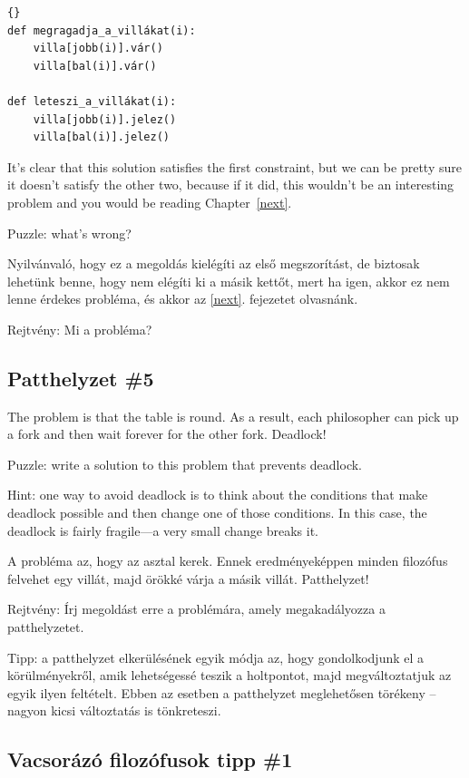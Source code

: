 \documentclass{book}
\newcommand{\clearemptydoublepage}{\newpage\cleardoublepage}
\begin{document}
\begin{lstlisting}[title={Vacsorázó filozófusok nem-megoldás}]{}
def megragadja_a_villákat(i):
    villa[jobb(i)].vár()
    villa[bal(i)].vár()

def leteszi_a_villákat(i):
    villa[jobb(i)].jelez()
    villa[bal(i)].jelez()
\end{lstlisting}

It's clear that this solution satisfies the first constraint, but
we can be pretty sure it doesn't satisfy the other two, because
if it did, this wouldn't be an interesting problem and you would
be reading Chapter~\ref{next}.

Puzzle: what's wrong?

Nyilvánvaló, hogy ez a megoldás kielégíti az első megszorítást, de biztosak
lehetünk benne, hogy nem elégíti ki a másik kettőt, mert ha igen,
akkor ez nem lenne érdekes probléma, és akkor az \ref{next}. fejezetet olvasnánk.

Rejtvény: Mi a probléma?

\clearemptydoublepage
\subsection{Patthelyzet \#5}

The problem is that the table is round.  As a result, each philosopher
can pick up a fork and then wait forever for the other fork.  Deadlock!

Puzzle: write a solution to this problem that prevents deadlock.

Hint: one way to avoid deadlock is to think about the conditions
that make deadlock possible and then change one of those conditions.
In this case, the deadlock is fairly fragile---a very small change
breaks it.

A probléma az, hogy az asztal kerek. Ennek eredményeképpen minden
filozófus felvehet egy villát, majd örökké várja a másik villát.
Patthelyzet!

Rejtvény: Írj megoldást erre a problémára, amely megakadályozza
a patthelyzetet.

Tipp: a patthelyzet elkerülésének egyik módja az, hogy gondolkodjunk
el a körülményekről, amik lehetségessé teszik a holtpontot, majd
megváltoztatjuk az egyik ilyen feltételt. Ebben az esetben a patthelyzet
meglehetősen  törékeny -- nagyon kicsi változtatás is tönkreteszi.

\clearemptydoublepage
\subsection{Vacsorázó filozófusok tipp \#1}
\end{document}
